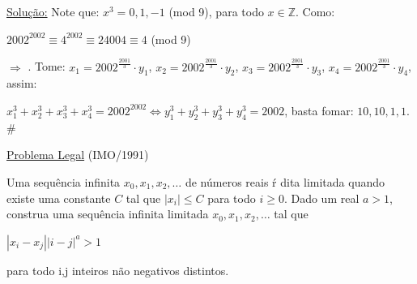 \documentclass[a4paper,12pt]{article}
\renewcommand{\leq}{\ensuremath{\leqslant}}
\renewcommand{\geq}{\ensuremath{\geqslant}}
\theoremstyle{plain} %
\theoremstyle{definition} %
\theoremstyle{remark} %
\begin{document}
	\begin{framed}
		\underline{Solu\c{c}\~ao:} Note que: $x^3=0, 1, -1$ (mod 9), para todo $x\in \mathds{Z}$. Como:
		
		\begin{center}
			$2002^{2002}\equiv 4^{2002}\equiv 2{4004}\equiv 4$ (mod 9)
		\end{center}
		
		$\Rightarrow$ \fbox{$t\geq 4$}. Tome: $x_1=2002^{\frac{2001}{3}}\cdot y_1$, $x_2=2002^{\frac{2001}{3}}\cdot y_2$, $x_3=2002^{\frac{2001}{3}}\cdot y_3$, $x_4=2002^{\frac{2001}{3}}\cdot y_4$, assim:
		
		$x_1^3+x_2^3+x_3^3+x_4^3=2002^{2002}\Leftrightarrow y_1^3+y_2^3+y_3^3+y_4^3=2002$, basta fomar: $10, 10, 1, 1$. \huge\#
		
		\normalsize
		
	\end{framed}
	
	\vspace{2ex}\underline{Problema Legal} (IMO/1991)
	
	Uma sequ\^encia infinita $x_0, x_1, x_2, \dotso$ de n\'umeros reais \'r dita limitada quando existe uma constante $C$ tal que $|x_i|\leq C$ para todo $i\geq 0$. Dado um real $a>1$, construa uma sequ\^encia infinita limitada $x_0, x_1, x_2, \dotso$ tal que
	
	\begin{center}
		$|x_i-x_j| |i-j|^a>1$
	\end{center}
	
	para todo i,j inteiros n\~ao negativos distintos.
	
\end{document}
